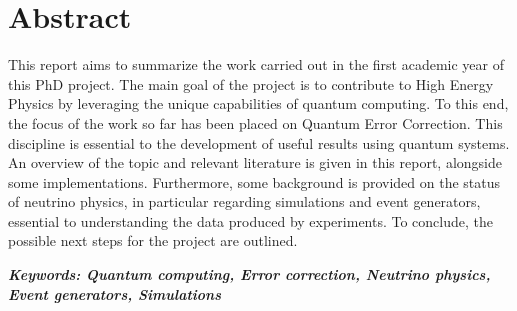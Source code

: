\chapter*{Abstract}

This report aims to summarize the work carried out in the first academic year of this PhD project. The main goal of the project is to contribute to High Energy Physics by leveraging the unique capabilities of quantum computing. To this end, the focus of the work so far has been placed on Quantum Error Correction. This discipline is essential to the development of useful results using quantum systems. An overview of the topic and relevant literature is given in this report, alongside some implementations. Furthermore, some background is provided on the status of neutrino physics, in particular regarding simulations and event generators, essential to understanding the data produced by experiments. To conclude, the possible next steps for the project are outlined.



\vspace{3cm}
\noindent\textit{\textbf{Keywords: Quantum computing, Error correction, Neutrino physics, Event generators, Simulations} } 
